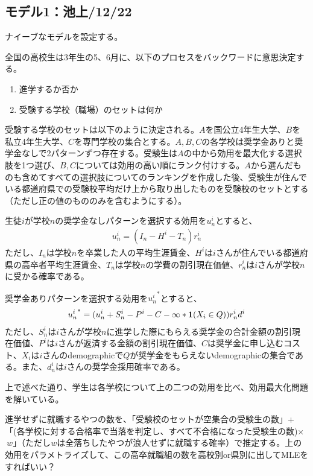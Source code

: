\documentclass{jsarticle}
\begin{document}
	\subsection{モデル1：池上/12/22}
	ナイーブなモデルを設定する。
	\par
	全国の高校生は3年生の5、6月に、以下のプロセスをバックワードに意思決定する。
	\begin{enumerate}
		\item 進学するか否か
		\item 受験する学校（職場）のセットは何か
	\end{enumerate}
	受験する学校のセットは以下のように決定される。$A$を国公立4年生大学、$B$を私立4年生大学、$C$を専門学校の集合とする。$A,B,C$の各学校は奨学金ありと奨学金なしで2パターンずつ存在する。受験生は$A$の中から効用を最大化する選択肢を1つ選び、$B,C$については効用の高い順にランク付けする。$A$から選んだものも含めてすべての選択肢についてのランキングを作成した後、受験生が住んでいる都道府県での受験校平均だけ上から取り出したものを受験校のセットとする（ただし正の値のもののみを含むようにする）。
	\par
	生徒$i$が学校$n$の奨学金なしパターンを選択する効用を$u_n^i$とすると、
	\begin{align*}
		u_n^i = (I_n - H^i - T_n) r_n^i
	\end{align*}
	ただし、$I_n$は学校$n$を卒業した人の平均生涯賃金、$H^i$は$i$さんが住んでいる都道府県の高卒者平均生涯賃金、$T_n$は学校$n$の学費の割引現在価値、$r_n^i$は$i$さんが学校$n$に受かる確率である。\par
	奨学金ありパターンを選択する効用を${u_n^i}^{*}$とすると、
	\begin{align*}
		{u_n^i}^{*} = (u_n^i + S_n^i - P^i - C - \infty * {\bf 1}(X_i \in Q)) r_n^i d^i
	\end{align*}
	ただし、$S_n^i$は$i$さんが学校$n$に進学した際にもらえる奨学金の合計金額の割引現在価値、$P^i$は$i$さんが返済する金額の割引現在価値、$C$は奨学金に申し込むコスト、$X_i$は$i$さんのdemographicで$Q$が奨学金をもらえないdemographicの集合である。また、$d_n^i$は$i$さんの奨学金採用確率である。
	\par
	上で述べた通り、学生は各学校について上の二つの効用を比べ、効用最大化問題を解いている。
	\par
	進学せずに就職するやつの数を、「受験校のセットが空集合の受験生の数」+「(各学校に対する合格率で当落を判定し、すべて不合格になった受験生の数)×$\ w$」（ただし$w$は全落ちしたやつが浪人せずに就職する確率）で推定する。上の効用をパラメトライズして、この高卒就職組の数を高校別or県別に出してMLEをすればいい？
	
\end{document}
